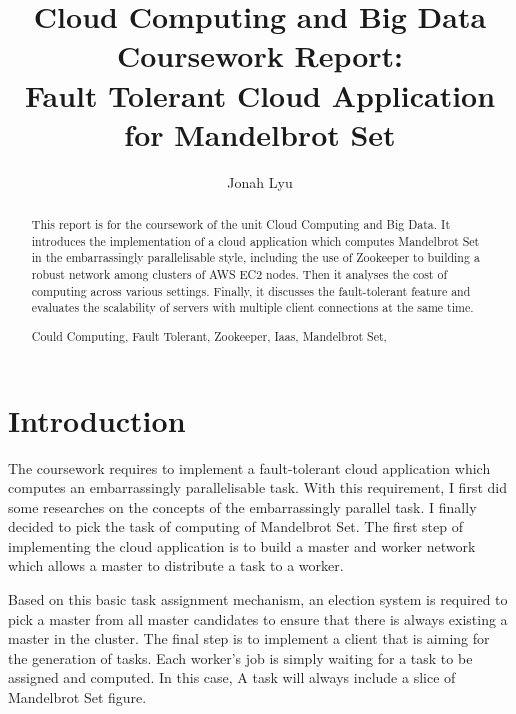 \documentclass[runningheads,a4paper]{llncs}
\newcommand{\keywords}[1]{\par\addvspace\baselineskip
\noindent\keywordname\enspace\ignorespaces#1}
\begin{document}
\mainmatter  %

\title{Cloud Computing and Big Data\\Coursework Report:\\
Fault Tolerant Cloud Application for Mandelbrot Set}


\author{Jonah Lyu}



\maketitle


\begin{abstract}
This report is for the coursework of the unit Cloud Computing and Big Data. It introduces the implementation of a cloud application which computes Mandelbrot Set in the embarrassingly parallelisable style, including the use of Zookeeper to building a robust network among clusters of AWS EC2 nodes. Then it analyses the cost of computing across various settings. Finally, it discusses the fault-tolerant feature and evaluates the scalability of servers with multiple client connections at the same time.

\keywords{Could Computing, Fault Tolerant, Zookeeper, Iaas, Mandelbrot Set,}

\end{abstract}

\section{Introduction}

The coursework requires to implement a fault-tolerant cloud application which computes an embarrassingly parallelisable task. With this requirement, I first did some researches on the concepts of the embarrassingly parallel task. I finally decided to pick the task of computing of Mandelbrot Set. The first step of implementing the cloud application is to build a master and worker network which allows a master to distribute a task to a worker. 

Based on this basic task assignment mechanism, an election system is required to pick a master from all master candidates to ensure that there is always existing a master in the cluster. The final step is to implement a client that is aiming for the generation of tasks. Each worker's job is simply waiting for a task to be assigned and computed. In this case, A task will always include a slice of Mandelbrot Set figure. 
\end{document}

